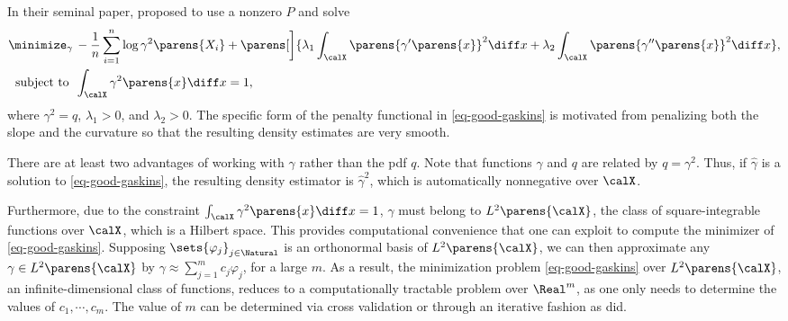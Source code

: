 \documentclass[12pt]{article}
\theoremstyle{definition}
\theoremstyle{theorem}
\theoremstyle{remark}
\begin{document}

In their seminal paper, \textcite{Good1971-gm} proposed to use a nonzero $P$ and solve 
\begin{equation}\label{eq-good-gaskins}
	\begin{aligned}
		\minimize_{\gamma} & \, - \frac{1}{n} \sum_{i=1}^n \log \gamma^2 \parens{X_i} +  \parens[\bigg]{\lambda_1 \int_{\calX} \parens{\gamma' \parens{x}}^2 \diff x + \lambda_2 \int_{\calX} \parens{\gamma'' \parens{x}}^2 \diff x  }, \\ 
		\text{ subject to } & \, \int_{\calX} \gamma^2 \parens{x} \diff x = 1, 
	\end{aligned}
\end{equation}
where $\gamma^2 = q$, $\lambda_1 > 0$, and $\lambda_2 > 0$. The specific form of the penalty functional in \eqref{eq-good-gaskins} is motivated from penalizing both the slope and the curvature so that the resulting density estimates are very smooth. 

There are at least two advantages of working with $\gamma$ rather than the pdf $q$. Note that functions $\gamma$ and $q$ are related by $q = \gamma^2$. Thus, if $\hat{\gamma}$ is a solution to \eqref{eq-good-gaskins}, the resulting density estimator is $\hat{\gamma}^2$, which is automatically nonnegative over $\calX$. 

Furthermore, due to the constraint $\int_{\calX} \gamma^2 \parens{x} \diff x = 1$, $\gamma$ must belong to $L^2 \parens{\calX}$, the class of square-integrable functions over $\calX$, which is a Hilbert space. This provides computational convenience that one can exploit to compute the minimizer of \eqref{eq-good-gaskins}. Supposing $\sets{\varphi_j}_{j \in \Natural}$ is an orthonormal basis of $L^2 \parens{\calX}$, we can then approximate any $\gamma \in L^2 \parens{\calX}$ by $\gamma \approx \sum_{j=1}^{m} c_j \varphi_j$, for a large $m$. As a result, the minimization problem \eqref{eq-good-gaskins} over $L^2 \parens{\calX}$, an infinite-dimensional class of functions, reduces to a computationally tractable problem over $\Real^m$, as one only needs to determine the values of $c_1, \cdots, c_m$. The value of $m$ can be determined via cross validation or through an iterative fashion as \textcites{Good1971-gm} did. 
\end{document}
